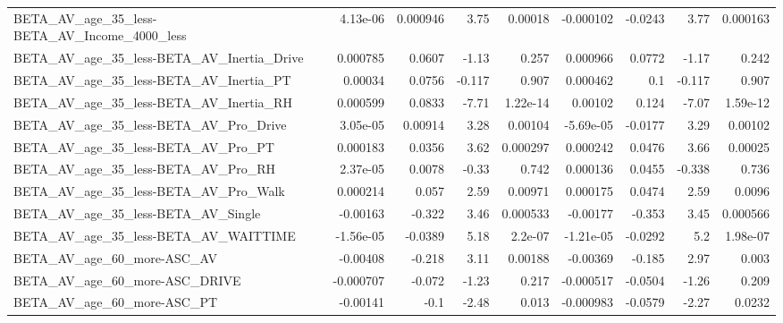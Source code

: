 \begin{tabular}{lrrrrrrrr}
BETA\_AV\_age\_35\_less-BETA\_AV\_Income\_4000\_less       &    4.13e-06 &     0.000946 &     3.75 &  0.00018 &  -0.000102 &     -0.0243 &         3.77 &      0.000163 \\
BETA\_AV\_age\_35\_less-BETA\_AV\_Inertia\_Drive          &    0.000785 &       0.0607 &    -1.13 &    0.257 &   0.000966 &      0.0772 &        -1.17 &         0.242 \\
BETA\_AV\_age\_35\_less-BETA\_AV\_Inertia\_PT             &     0.00034 &       0.0756 &   -0.117 &    0.907 &   0.000462 &         0.1 &       -0.117 &         0.907 \\
BETA\_AV\_age\_35\_less-BETA\_AV\_Inertia\_RH             &    0.000599 &       0.0833 &    -7.71 & 1.22e-14 &    0.00102 &       0.124 &        -7.07 &      1.59e-12 \\
BETA\_AV\_age\_35\_less-BETA\_AV\_Pro\_Drive              &    3.05e-05 &      0.00914 &     3.28 &  0.00104 &  -5.69e-05 &     -0.0177 &         3.29 &       0.00102 \\
BETA\_AV\_age\_35\_less-BETA\_AV\_Pro\_PT                 &    0.000183 &       0.0356 &     3.62 & 0.000297 &   0.000242 &      0.0476 &         3.66 &       0.00025 \\
BETA\_AV\_age\_35\_less-BETA\_AV\_Pro\_RH                 &    2.37e-05 &       0.0078 &    -0.33 &    0.742 &   0.000136 &      0.0455 &       -0.338 &         0.736 \\
BETA\_AV\_age\_35\_less-BETA\_AV\_Pro\_Walk               &    0.000214 &        0.057 &     2.59 &  0.00971 &   0.000175 &      0.0474 &         2.59 &        0.0096 \\
BETA\_AV\_age\_35\_less-BETA\_AV\_Single                 &    -0.00163 &       -0.322 &     3.46 & 0.000533 &   -0.00177 &      -0.353 &         3.45 &      0.000566 \\
BETA\_AV\_age\_35\_less-BETA\_AV\_WAITTIME               &   -1.56e-05 &      -0.0389 &     5.18 &  2.2e-07 &  -1.21e-05 &     -0.0292 &          5.2 &      1.98e-07 \\
BETA\_AV\_age\_60\_more-ASC\_AV                         &    -0.00408 &       -0.218 &     3.11 &  0.00188 &   -0.00369 &      -0.185 &         2.97 &         0.003 \\
BETA\_AV\_age\_60\_more-ASC\_DRIVE                      &   -0.000707 &       -0.072 &    -1.23 &    0.217 &  -0.000517 &     -0.0504 &        -1.26 &         0.209 \\
BETA\_AV\_age\_60\_more-ASC\_PT                         &    -0.00141 &         -0.1 &    -2.48 &    0.013 &  -0.000983 &     -0.0579 &        -2.27 &        0.0232 \\

\end{tabular}
